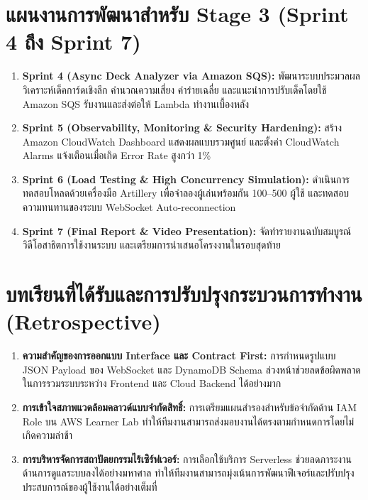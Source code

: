 \documentclass[12pt,a4paper]{report}
\begin{document}
\section{แผนงานการพัฒนาสำหรับ Stage 3 (Sprint 4 ถึง Sprint 7)}
\begin{enumerate}
    \item \textbf{Sprint 4 (Async Deck Analyzer via Amazon SQS):} พัฒนาระบบประมวลผลวิเคราะห์เด็คการ์ดเชิงลึก คำนวณความเสี่ยง ค่าร่ายเฉลี่ย และแนะนำการปรับเด็คโดยใช้ Amazon SQS รับงานและส่งต่อให้ Lambda ทำงานเบื้องหลัง
    \item \textbf{Sprint 5 (Observability, Monitoring \& Security Hardening):} สร้าง Amazon CloudWatch Dashboard แสดงผลแบบรวมศูนย์ และตั้งค่า CloudWatch Alarms แจ้งเตือนเมื่อเกิด Error Rate สูงกว่า 1\%
    \item \textbf{Sprint 6 (Load Testing \& High Concurrency Simulation):} ดำเนินการทดสอบโหลดด้วยเครื่องมือ Artillery เพื่อจำลองผู้เล่นพร้อมกัน 100--500 ผู้ใช้ และทดสอบความทนทานของระบบ WebSocket Auto-reconnection
    \item \textbf{Sprint 7 (Final Report \& Video Presentation):} จัดทำรายงานฉบับสมบูรณ์ วิดีโอสาธิตการใช้งานระบบ และเตรียมการนำเสนอโครงงานในรอบสุดท้าย
\end{enumerate}

\section{บทเรียนที่ได้รับและการปรับปรุงกระบวนการทำงาน (Retrospective)}
\begin{enumerate}
    \item \textbf{ความสำคัญของการออกแบบ Interface และ Contract First:} การกำหนดรูปแบบ JSON Payload ของ WebSocket และ DynamoDB Schema ล่วงหน้าช่วยลดข้อผิดพลาดในการรวมระบบระหว่าง Frontend และ Cloud Backend ได้อย่างมาก
    \item \textbf{การเข้าใจสภาพแวดล้อมคลาวด์แบบจำกัดสิทธิ์:} การเตรียมแผนสำรองสำหรับข้อจำกัดด้าน IAM Role บน AWS Learner Lab ทำให้ทีมงานสามารถส่งมอบงานได้ตรงตามกำหนดการโดยไม่เกิดความล่าช้า
    \item \textbf{การบริหารจัดการสถาปัตยกรรมไร้เซิร์ฟเวอร์:} การเลือกใช้บริการ Serverless ช่วยลดภาระงานด้านการดูแลระบบลงได้อย่างมหาศาล ทำให้ทีมงานสามารถมุ่งเน้นการพัฒนาฟีเจอร์และปรับปรุงประสบการณ์ของผู้ใช้งานได้อย่างเต็มที่
\end{enumerate}

\end{document}
